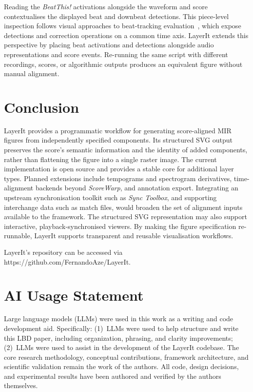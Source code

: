 \documentclass{article}
\begin{document}
Reading the \textit{BeatThis!} activations alongside the waveform and score contextualises the displayed beat and downbeat detections. This piece-level inspection follows visual approaches to beat-tracking evaluation~\cite{pintoShiftIfYouCan2020}, which expose detections and correction operations on a common time axis. LayerIt extends this perspective by placing beat activations and detections alongside audio representations and score events. Re-running the same script with different recordings, scores, or algorithmic outputs produces an equivalent figure without manual alignment.

\section{Conclusion}\label{sec:conclusion}

LayerIt provides a programmatic workflow for generating score-aligned MIR figures from independently specified components. Its structured SVG output preserves the score's semantic information and the identity of added components, rather than flattening the figure into a single raster image. The current implementation is open source and provides a stable core for additional layer types. Planned extensions include tempograms and spectrogram derivatives, time-alignment backends beyond \textit{ScoreWarp}, and annotation export. Integrating an upstream synchronisation toolkit such as \textit{Sync Toolbox}, and supporting interchange data such as match files, would broaden the set of alignment inputs available to the framework. The structured SVG representation may also support interactive, playback-synchronised viewers. By making the figure specification re-runnable, LayerIt supports transparent and reusable visualisation workflows.

LayerIt's repository can be accessed via https://github.com/FernandoAze/LayerIt.

\newpage

\section{AI Usage Statement}

Large language models (LLMs) were used in this work as a writing and code development aid. Specifically: (1)~LLMs were used to help structure and write this LBD paper, including organization, phrasing, and clarity improvements; (2)~LLMs were used to assist in the development of the LayerIt codebase. The core research methodology, conceptual contributions, framework architecture, and scientific validation remain the work of the authors. All code, design decisions, and experimental results have been authored and verified by the authors themselves.


\end{document}
